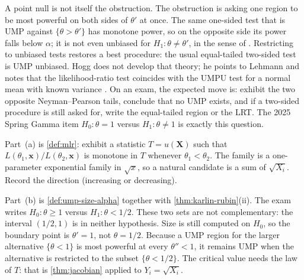 \documentclass[11pt,a4paper]{article}
\begin{document}
\begin{remark}
\label{rem:two-sided-no-ump}
A point null is not itself the obstruction. The obstruction is asking one region to be most powerful on both sides of \(\theta'\) at once. The same one-sided test that is UMP against \(\{\theta>\theta'\}\) has monotone power, so on the opposite side its power falls below \(\alpha\); it is not even unbiased for \(H_1:\theta\neq\theta'\), in the sense of \citep[Definition~8.1.2]{hogg2019}. Restricting to unbiased tests restores a best procedure: the usual equal-tailed two-sided test is UMP unbiased. Hogg does not develop that theory; he points to Lehmann and notes that the likelihood-ratio test coincides with the UMPU test for a normal mean with known variance \citep[\S8.3, after (8.3.1)]{hogg2019}. On an exam, the expected move is: exhibit the two opposite Neyman--Pearson tails, conclude that no UMP exists, and if a two-sided procedure is still asked for, write the equal-tailed region or the LRT. The 2025 Spring Gamma item \(H_0:\theta=1\) versus \(H_1:\theta\neq 1\) is exactly this question.
\end{remark}

\begin{remark}
\label{rem:p7-toolkit}
Part~(a) is \cref{def:mlr}: exhibit a statistic \(T=u(\mathbf{X})\) such that \(L(\theta_1,\mathbf{x})/L(\theta_2,\mathbf{x})\) is monotone in \(T\) whenever \(\theta_1<\theta_2\). The family is a one-parameter exponential family in \(\sqrt{x}\), so a natural candidate is a sum of \(\sqrt{X_i}\). Record the direction (increasing or decreasing).

Part~(b) is \cref{def:ump-size-alpha} together with \cref{thm:karlin-rubin}(ii). The exam writes \(H_0:\theta\ge 1\) versus \(H_1:\theta<1/2\). These two sets are not complementary: the interval \((1/2,1)\) is in neither hypothesis. Size is still computed on \(H_0\), so the boundary point is \(\theta'=1\), not \(\theta=1/2\). Because a UMP region for the larger alternative \(\{\theta<1\}\) is most powerful at every \(\theta''<1\), it remains UMP when the alternative is restricted to the subset \(\{\theta<1/2\}\). The critical value needs the law of \(T\): that is \cref{thm:jacobian} applied to \(Y_i=\sqrt{X_i}\).
\end{remark}
\end{document}
